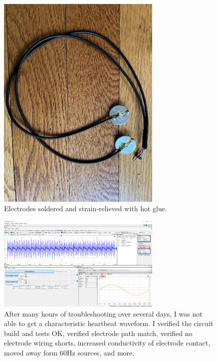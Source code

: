 \documentclass{article}
\begin{document}
		\begin{figure}[H]
			\centering
			\includegraphics[width=0.7\textwidth]{p2}
			\caption{Electrodes soldered and strain-relieved with hot glue.}
		\end{figure}

		\begin{figure}[H]
			\centering
			\includegraphics[width=0.7\textwidth]{wn2}
			\caption{After many hours of troubleshooting over several days, I was not able to get a characteristic heartbeat waveform. I verified the circuit build and tests OK, verified electrode path match, verified no electrode wiring shorts, increased conductivity of electrode contact, moved away form 60Hz sources, and more.}
		\end{figure}

\end{document}
